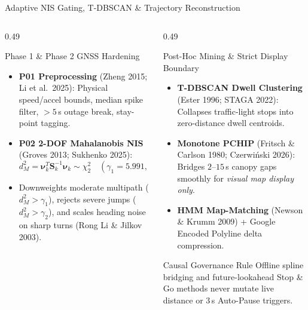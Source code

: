 \documentclass[aspectratio=169,10pt]{beamer}
\begin{document}
\begin{frame}{Adaptive NIS Gating, T-DBSCAN \& Trajectory Reconstruction}
  \begin{columns}[T]
    \begin{column}{0.49\textwidth}
      \begin{block}{Phase 1 \& Phase 2 GNSS Hardening}
        \begin{itemize}\small
          \item \textbf{P01 Preprocessing} (Zheng 2015; Li et al.\ 2025): Physical speed/accel bounds, median spike filter, $>5$\,s outage break, stay-point tagging.
          \item \textbf{P02 2-DOF Mahalanobis NIS} (Groves 2013; Sukhenko 2025):
            \[
              d_M^2 = \boldsymbol{\nu}_k^T \mathbf{S}_k^{-1}\boldsymbol{\nu}_k \sim \chi_2^2 \quad (\gamma_1 = 5.991,\; \gamma_2 = 13.816)
            \]
          \item Downweights moderate multipath ($d_M^2 > \gamma_1$), rejects severe jumps ($d_M^2 > \gamma_2$), and scales heading noise on sharp turns (Rong Li \& Jilkov 2003).
        \end{itemize}
      \end{block}
    \end{column}
    \begin{column}{0.49\textwidth}
      \begin{block}{Post-Hoc Mining \& Strict Display Boundary}
        \begin{itemize}\small
          \item \textbf{T-DBSCAN Dwell Clustering} (Ester 1996; STAGA 2022): Collapses traffic-light stops into zero-distance dwell centroids.
          \item \textbf{Monotone PCHIP} (Fritsch \& Carlson 1980; Czerwi\'nski 2026): Bridges $2$--$15$\,s canopy gaps smoothly for \emph{visual map display only}.
          \item \textbf{HMM Map-Matching} (Newson \& Krumm 2009) + Google Encoded Polyline delta compression.
        \end{itemize}
      \end{block}
      \begin{alertblock}{Causal Governance Rule}
        \footnotesize Offline spline bridging and future-lookahead Stop \& Go methods never mutate live distance or 3\,s Auto-Pause triggers.
      \end{alertblock}
    \end{column}
  \end{columns}
\end{frame}
\end{document}
